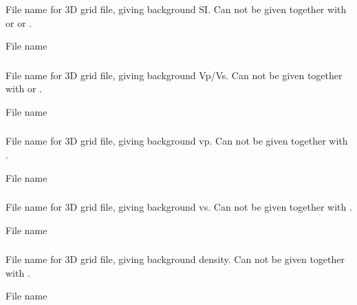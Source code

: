 \subsubsection{}
 \slist
   \item \Description File name for 3D grid file, giving background
   SI. Can not be given together with  or 
   or .
   \item \Argument File name
   \item \Default
 \elist

\subsubsection{}
 \slist
   \item \Description File name for 3D grid file, giving background
   Vp/Vs. Can not be given together with  or .
   \item \Argument File name
   \item \Default
 \elist

\subsubsection{}
 \slist
   \item \Description File name for 3D grid file, giving background vp. Can not be given together with .
   \item \Argument File name
   \item \Default
 \elist

\subsubsection{}
 \slist
   \item \Description File name for 3D grid file, giving background vs. Can not be given together with .
   \item \Argument File name
   \item \Default
 \elist

\subsubsection{}
 \slist
   \item \Description File name for 3D grid file, giving background density. Can not be given together with .
   \item \Argument File name
   \item \Default
 \elist

